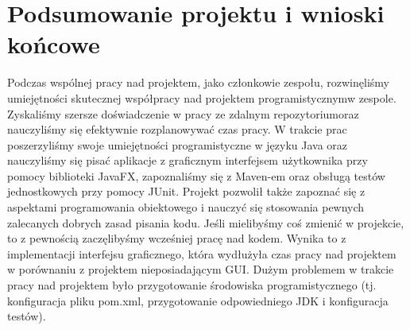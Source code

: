\documentclass{article}
\begin{document}
\section{Podsumowanie projektu i wnioski końcowe}
Podczas wspólnej pracy nad projektem, jako członkowie zespołu, rozwinęliśmy umiejętności skutecznej współpracy nad projektem programistycznym\linebreak w zespole. Zyskaliśmy szersze doświadczenie w pracy ze zdalnym repozytorium\linebreak oraz nauczyliśmy się efektywnie rozplanowywać czas pracy. W trakcie prac poszerzyliśmy swoje umiejętności programistyczne w języku Java oraz nauczyliśmy się pisać aplikacje z graficznym interfejsem użytkownika przy pomocy biblioteki JavaFX, zapoznaliśmy się z Maven-em oraz obsługą testów jednostkowych przy pomocy JUnit. Projekt pozwolił także zapoznać się z aspektami programowania obiektowego i nauczyć się stosowania pewnych zalecanych dobrych zasad pisania kodu.
Jeśli mielibyśmy coś zmienić w projekcie, to z pewnością zaczęlibyśmy wcześniej pracę nad kodem. Wynika to z implementacji interfejsu graficznego, która wydłużyła czas pracy nad projektem w porównaniu z projektem nieposiadającym GUI. Dużym problemem w trakcie pracy nad projektem było przygotowanie środowiska programistycznego (tj. konfiguracja pliku pom.xml, przygotowanie odpowiedniego JDK i konfiguracja testów).
\end{document}
